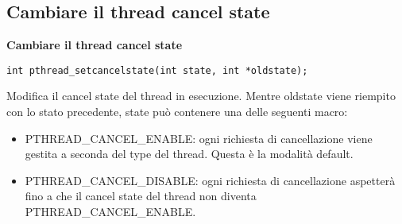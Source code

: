 \begin{flushleft}
  \subsection{Cambiare il thread cancel state}
  \begin{flushleft}
    \textbf{Cambiare il thread cancel state}\\
    \begin{flushleft}
      \texttt{int pthread\_setcancelstate(int state, int *oldstate);}
    \end{flushleft}
    Modifica il cancel state del thread in esecuzione. Mentre oldstate viene riempito 
    con lo stato precedente, state può contenere una delle seguenti macro:
    \begin{itemize}
      \item PTHREAD\_CANCEL\_ENABLE: ogni richiesta di cancellazione viene gestita a 
      seconda del type del thread. Questa è la modalità default.
      \item PTHREAD\_CANCEL\_DISABLE: ogni richiesta di cancellazione aspetterà fino a 
      che il cancel state del thread non diventa PTHREAD\_CANCEL\_ENABLE.
    \end{itemize}
  \end{flushleft}

\end{flushleft}
